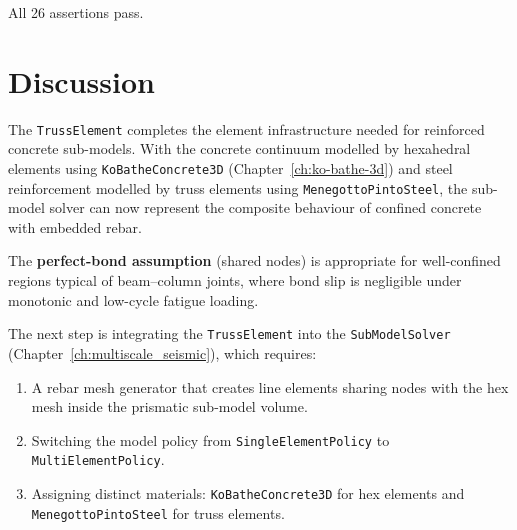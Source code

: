 All 26 assertions pass.


\section{Discussion}
\label{sec:truss-discussion}

The \texttt{TrussElement} completes the element infrastructure needed for
reinforced concrete sub-models.  With the concrete continuum modelled by
hexahedral elements using \texttt{KoBatheConcrete3D}
(Chapter~\ref{ch:ko-bathe-3d}) and steel reinforcement modelled by truss
elements using \texttt{MenegottoPintoSteel}, the sub-model solver can
now represent the composite behaviour of confined concrete with embedded
rebar.

The \textbf{perfect-bond assumption} (shared nodes) is appropriate for
well-confined regions typical of beam--column joints, where bond slip is
negligible under monotonic and low-cycle fatigue loading.

The next step is integrating the \texttt{TrussElement} into the
\texttt{SubModelSolver} (Chapter~\ref{ch:multiscale_seismic}), which
requires:
\begin{enumerate}
    \item A rebar mesh generator that creates line elements sharing nodes
          with the hex mesh inside the prismatic sub-model volume.
    \item Switching the model policy from \texttt{SingleElementPolicy} to
          \texttt{MultiElementPolicy}.
    \item Assigning distinct materials: \texttt{KoBatheConcrete3D} for hex
          elements and \texttt{MenegottoPintoSteel} for truss elements.
\end{enumerate}
